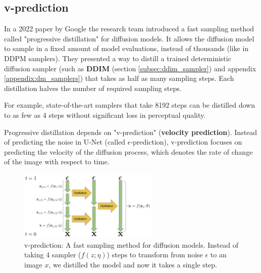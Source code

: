 \subsection{v-prediction}

In a 2022 paper by Google \cite{v_prediction} the research team introduced a fast sampling method called "progressive distillation" for diffusion models. It allows the diffusion model to sample in a fixed amount of model evaluations, instead of thousands (like in DDPM samplers). They presented a way to distill a trained deterministic diffusion sampler (such as \textbf{DDIM} (section \ref{subsec:ddim_sampler}) and appendix \ref{appendix:dm_samplers}) that takes as half as many sampling steps. Each distillation halves the number of required sampling steps.

For example, state-of-the-art samplers that take 8192 steps can be distilled down to as few as 4 steps without significant loss in perceptual quality.

Progressive distillation depends on "v-prediction" (\textbf{velocity prediction}). Instead of predicting the noise in U-Net (called $\epsilon$-prediction), v-prediction focuses on predicting the velocity of the diffusion process, which denotes the rate of change of the image with respect to time.

\begin{figure}
    \centering
    \includegraphics[width=0.6\textwidth]{images/imagen_video/v_prediction.png}
    \caption{v-prediction: A fast sampling method for diffusion models. Instead of taking 4 sampler ($f(z; \eta)$) steps to transform from noise $\epsilon$ to an image $x$, we distilled the model and now it takes a single step.}
    \label{fig:progressive_distillation}
\end{figure}

